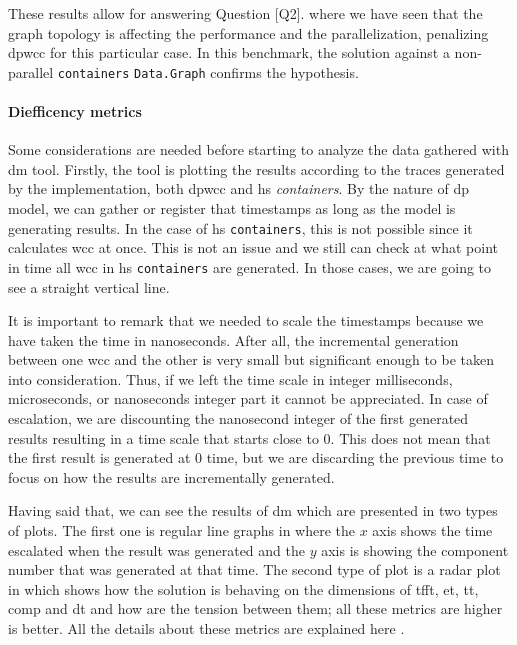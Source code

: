 These results allow for answering Question [Q2]. where we have seen that the graph topology is affecting the performance and the parallelization, penalizing \acrshort{dpwcc} for this particular case. In this benchmark, 
the solution against a non-parallel \texttt{containers} \texttt{Data.Graph} confirms the hypothesis. 

\paragraph{Diefficency metrics} Some considerations are needed before starting to analyze the data gathered with \acrfull{dm} tool. Firstly, the tool is plotting the results according to the traces generated by the implementation, 
both \acrshort{dpwcc} and \acrshort{hs} \emph{containers}. By the nature of \acrshort{dp} model, we can gather or register that timestamps as long as the model is generating results. In the case of \acrshort{hs} \texttt{containers}, this is not possible since it 
calculates \acrshort{wcc} at once. This is not an issue and we still can check at what point in time all \acrshort{wcc} in \acrshort{hs} \texttt{containers} are generated. In those cases, we are going to see a straight vertical line. 

It is important to remark that we needed to scale the timestamps because we have taken the time in nanoseconds. After all, the incremental generation between one \acrshort{wcc} and the other is very 
small but significant enough to be taken into consideration. Thus, if we left the time scale in integer milliseconds, microseconds, or nanoseconds integer part it cannot be appreciated. In case of escalation, we are discounting 
the nanosecond integer of the first generated results resulting in a time scale that starts close to $0$. This does not mean that the first result is generated at $0$ time, but we are discarding the previous time to focus on how the results are incrementally generated.

Having said that, we can see the results of \acrshort{dm} which are presented in two types of plots. The first one is regular line graphs in where the $x$ axis shows the time escalated when 
the result was generated and the $y$ axis is showing the component number that was generated at that time. The second type of plot is a radar plot in which shows how the solution is behaving 
on the dimensions of  \acrfull{tfft}, \acrfull{et}, \acrfull{tt}, \acrfull{comp} and \acrfull{dt} and how are the tension between them; all these metrics are higher is better. 
All the details about these metrics are explained here \cite{diefpaper}.

